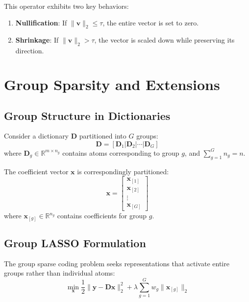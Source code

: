 \documentclass[12pt]{article}
\renewcommand{\vec}[1]{\mathbf{#1}}
\theoremstyle{definition}
\begin{document}
This operator exhibits two key behaviors:
\begin{enumerate}
    \item \textbf{Nullification}: If $\|\vec{v}\|_2 \leq \tau$, the entire vector is set to zero.
    \item \textbf{Shrinkage}: If $\|\vec{v}\|_2 > \tau$, the vector is scaled down while preserving its direction.
\end{enumerate}

\newpage

\section{Group Sparsity and Extensions}

\subsection{Group Structure in Dictionaries}

Consider a dictionary $\vec{D}$ partitioned into $G$ groups:
\begin{equation}
    \vec{D} = [\vec{D}_1 | \vec{D}_2 | \cdots | \vec{D}_G]
\end{equation}
where $\vec{D}_g \in \mathbb{R}^{m \times n_g}$ contains atoms corresponding to group $g$, and $\sum_{g=1}^{G} n_g = n$.

The coefficient vector $\vec{x}$ is correspondingly partitioned:
\begin{equation}
    \vec{x} = \begin{bmatrix} \vec{x}_{[1]} \\ \vec{x}_{[2]} \\ \vdots \\ \vec{x}_{[G]} \end{bmatrix}
\end{equation}
where $\vec{x}_{[g]} \in \mathbb{R}^{n_g}$ contains coefficients for group $g$.

\subsection{Group LASSO Formulation}

The group sparse coding problem seeks representations that activate entire groups rather than individual atoms:
\begin{equation}
    \min_{\vec{x}} \frac{1}{2}\|\vec{y} - \vec{D}\vec{x}\|_2^2 + \lambda\sum_{g=1}^{G} w_g\|\vec{x}_{[g]}\|_2
    \label{eq:group_lasso}
\end{equation}
\end{document}
